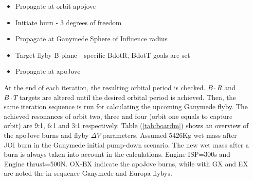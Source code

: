 \begin{itemize}
  \item Propagate at orbit apojove
  \item Initiate burn - 3 degrees of freedom
  \item Propagate at Ganymede Sphere of Influence radius
  \item Target flyby B-plane - specific BdotR, BdotT goals are set
  \item Propagate at apoJove
\end{itemize}

At the end of each iteration, the resulting orbital period is checked. $B\cdot R$ and $B\cdot T$ targets are altered until the desired orbital period is achieved. Then, the same iteration sequence is run for calculating the upcoming Ganymede flyby. The achieved resonances of orbit two, three and four (orbit one equals to capture orbit) are 9:1, 6:1 and 3:1 respectively. 
Table (\ref{tab:boardm}) shows an overview of the apoJove burns and flyby $\Delta V$ parameters. Assumed 5426Kg wet mass after JOI burn in the Ganymede initial pump-down scenario. The new wet mass after a burn is always taken into account in the calculations. Engine ISP=300s and Engine thrust=500N. OX-BX indicate the apoJove burns, while with GX and EX are noted the in sequence Ganymede and Europa flybys.

